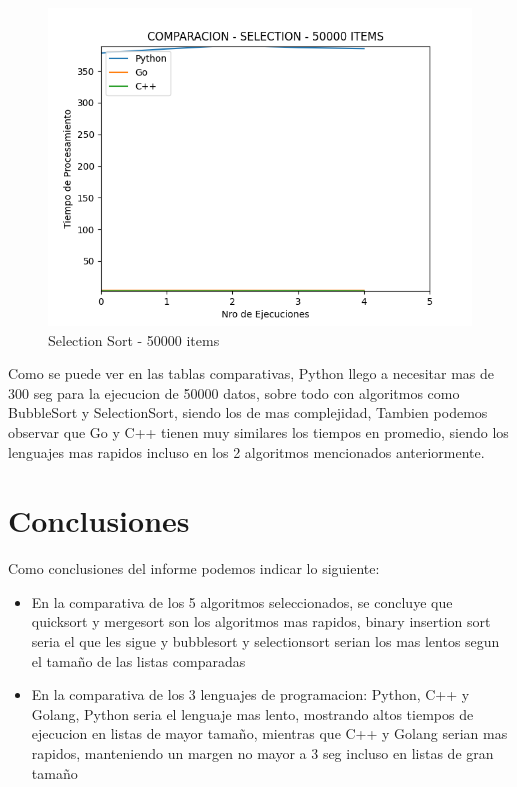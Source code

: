\documentclass[12pt]{article} %
\begin{document}
    \vspace{5mm}
    
    \begin{figure}[H]
    \centering
    \includegraphics[width=\textwidth]{selection_50000}
    \caption{Selection Sort - 50000 items}
    \end{figure}

    \vspace{8cm}



Como se puede ver en las tablas comparativas, Python llego a necesitar mas de 300 seg para la ejecucion de 50000 datos, sobre todo con algoritmos como BubbleSort y SelectionSort, siendo los de mas complejidad,
Tambien podemos observar que Go y C++ tienen muy similares los tiempos en promedio, siendo los lenguajes mas rapidos incluso en los 2 algoritmos mencionados anteriormente.


\vspace{5mm}

\section{Conclusiones}

Como conclusiones del informe podemos indicar lo siguiente:

\begin{itemize}
    \item En la comparativa de los 5 algoritmos seleccionados, se concluye que quicksort y mergesort son los algoritmos mas rapidos, binary insertion sort seria el que les sigue y bubblesort y selectionsort serian los mas lentos
    segun el tamaño de las listas comparadas
    \item En la comparativa de los 3 lenguajes de programacion: Python, C++ y Golang, Python seria el lenguaje mas lento, mostrando altos tiempos de ejecucion en listas de mayor tamaño, mientras que C++ y Golang serian mas rapidos, manteniendo un margen no mayor a 3 seg incluso en listas de gran tamaño
\end{itemize}
\end{document}
